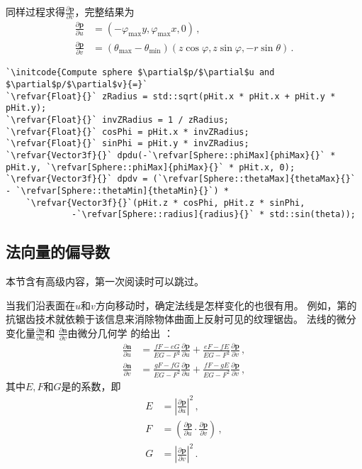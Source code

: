 同样过程求得$\displaystyle\frac{\partial \bm p}{\partial v}$，完整结果为
\begin{align*}
    \frac{\partial \bm p}{\partial u} & =(-\varphi_{\max}y,\varphi_{\max}x,0)\, ,                                  \\
    \frac{\partial \bm p}{\partial v} & =(\theta_{\max}-\theta_{\min})(z\cos\varphi,z\sin\varphi,-r\sin\theta)\, .
\end{align*}
\begin{lstlisting}
`\initcode{Compute sphere $\partial$p/$\partial$u and $\partial$p/$\partial$v}{=}`
`\refvar{Float}{}` zRadius = std::sqrt(pHit.x * pHit.x + pHit.y * pHit.y);
`\refvar{Float}{}` invZRadius = 1 / zRadius;
`\refvar{Float}{}` cosPhi = pHit.x * invZRadius;
`\refvar{Float}{}` sinPhi = pHit.y * invZRadius;
`\refvar{Vector3f}{}` dpdu(-`\refvar[Sphere::phiMax]{phiMax}{}` * pHit.y, `\refvar[Sphere::phiMax]{phiMax}{}` * pHit.x, 0);
`\refvar{Vector3f}{}` dpdv = (`\refvar[Sphere::thetaMax]{thetaMax}{}` - `\refvar[Sphere::thetaMin]{thetaMin}{}`) *
    `\refvar{Vector3f}{}`(pHit.z * cosPhi, pHit.z * sinPhi,
             -`\refvar[Sphere::radius]{radius}{}` * std::sin(theta));
\end{lstlisting}

\subsection{法向量的偏导数}\label{sub:法向量的偏导数}
\begin{remark}
    本节含有高级内容，第一次阅读时可以跳过。
\end{remark}

当我们沿表面在$u$和$v$方向移动时，确定法线是怎样变化的也很有用。
例如，第的抗锯齿技术就依赖于该信息来消除物体曲面上反射可见的纹理锯齿。
法线的微分变化量$\displaystyle\frac{\partial \bm n}{\partial u}$和
$\displaystyle\frac{\partial \bm n}{\partial v}$由微分几何学
的给出
：
\begin{align*}
    \frac{\partial \bm n}{\partial u} & =\frac{fF-eG}{EG-F^2}\frac{\partial \bm p}{\partial u}+\frac{eF-fE}{EG-F^2}\frac{\partial \bm p}{\partial v}\, , \\
    \frac{\partial \bm n}{\partial v} & =\frac{gF-fG}{EG-F^2}\frac{\partial \bm p}{\partial u}+\frac{fF-gE}{EG-F^2}\frac{\partial \bm p}{\partial v}\, ,
\end{align*}
其中$E,F$和$G$是的系数，即
\begin{align*}
    E & =\left|\frac{\partial \bm p}{\partial u}\right|^2\, ,                                     \\
    F & =\left(\frac{\partial \bm p}{\partial u}\cdot\frac{\partial \bm p}{\partial v}\right)\, , \\
    G & =\left|\frac{\partial \bm p}{\partial v}\right|^2\, .
\end{align*}

